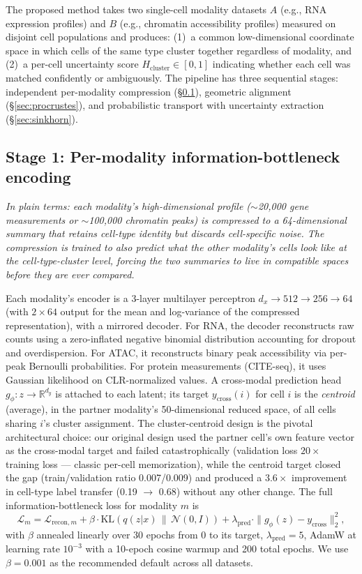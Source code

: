 \documentclass[pmlr]{jmlr}
\newcommand{\Hcluster}{H_{\text{cluster}}}
\begin{document}
The proposed method takes two single-cell modality datasets $A$ (e.g., RNA expression profiles) and $B$ (e.g., chromatin accessibility profiles) measured on disjoint cell populations and produces: (1)~a common low-dimensional coordinate space in which cells of the same type cluster together regardless of modality, and (2)~a per-cell uncertainty score $\Hcluster \in [0,1]$ indicating whether each cell was matched confidently or ambiguously. The pipeline has three sequential stages: independent per-modality compression (\S\ref{sec:ibvae}), geometric alignment (\S\ref{sec:procrustes}), and probabilistic transport with uncertainty extraction (\S\ref{sec:sinkhorn}).

\subsection{Stage 1: Per-modality information-bottleneck encoding}
\label{sec:ibvae}

\textit{In plain terms: each modality's high-dimensional profile ($\sim$20{,}000 gene measurements or $\sim$100{,}000 chromatin peaks) is compressed to a 64-dimensional summary that retains cell-type identity but discards cell-specific noise. The compression is trained to also predict what the other modality's cells look like at the cell-type-cluster level, forcing the two summaries to live in compatible spaces before they are ever compared.}

Each modality's encoder is a 3-layer multilayer perceptron $d_x \to 512 \to 256 \to 64$ (with $2 \times 64$ output for the mean and log-variance of the compressed representation), with a mirrored decoder. For RNA, the decoder reconstructs raw counts using a zero-inflated negative binomial distribution accounting for dropout and overdispersion. For ATAC, it reconstructs binary peak accessibility via per-peak Bernoulli probabilities. For protein measurements (CITE-seq), it uses Gaussian likelihood on CLR-normalized values. A cross-modal prediction head $g_\phi: z \to \mathbb{R}^{d_y}$ is attached to each latent; its target $y_{\text{cross}}(i)$ for cell $i$ is the \emph{centroid} (average), in the partner modality's 50-dimensional reduced space, of all cells sharing $i$'s cluster assignment. The cluster-centroid design is the pivotal architectural choice: our original design used the partner cell's own feature vector as the cross-modal target and failed catastrophically (validation loss $20\times$ training loss --- classic per-cell memorization), while the centroid target closed the gap (train/validation ratio 0.007/0.009) and produced a $3.6\times$ improvement in cell-type label transfer (0.19 $\to$ 0.68) without any other change. The full information-bottleneck loss for modality $m$ is
\begin{equation}
\mathcal{L}_m = \mathcal{L}_{\text{recon},m} + \beta \cdot \mathrm{KL}(q(z|x) \,\|\, \mathcal{N}(0, I)) + \lambda_{\text{pred}} \cdot \| g_\phi(z) - y_{\text{cross}} \|_2^2,
\label{eq:ibvae}
\end{equation}
with $\beta$ annealed linearly over 30 epochs from 0 to its target, $\lambda_{\text{pred}} = 5$, AdamW at learning rate $10^{-3}$ with a 10-epoch cosine warmup and 200 total epochs. We use $\beta = 0.001$ as the recommended default across all datasets.
\end{document}
